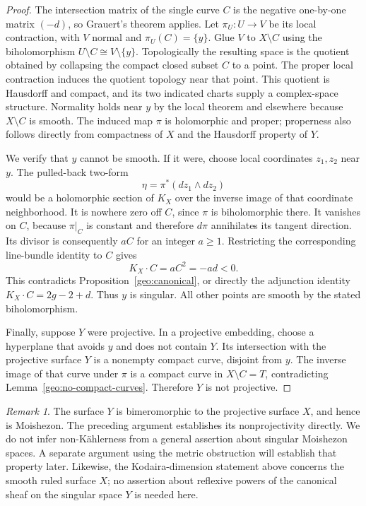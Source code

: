 \documentclass[11pt,a4paper]{article}
\numberwithin{equation}{section}
\theoremstyle{definition}
\theoremstyle{remark}
\newtheorem{remark}[theorem]{Remark}
\begin{document}
\begin{proof}
The intersection matrix of the single curve $C$ is the negative
one-by-one matrix $(-d)$, so Grauert's theorem applies.  Let
$\pi_U:U\to V$ be its local contraction, with $V$ normal and
$\pi_U(C)=\{y\}$.  Glue $V$ to $X\setminus C$ using the
biholomorphism $U\setminus C\cong V\setminus\{y\}$.
Topologically the resulting space is the quotient obtained by
collapsing the compact closed subset $C$ to a point.  The proper
local contraction induces the quotient topology near that point.
This quotient is Hausdorff and compact, and its two indicated
charts supply a complex-space structure.  Normality holds near
$y$ by the local theorem and elsewhere because $X\setminus C$
is smooth.  The induced map $\pi$ is holomorphic and proper;
properness also follows directly from compactness of $X$ and
the Hausdorff property of $Y$.

We verify that $y$ cannot be smooth.  If it were, choose local
coordinates $z_1,z_2$ near $y$.  The pulled-back two-form
\[
  \eta=\pi^*(dz_1\wedge dz_2)
\]
would be a holomorphic section of $K_X$ over the inverse image
of that coordinate neighborhood.  It is nowhere zero off $C$,
since $\pi$ is biholomorphic there.  It vanishes on $C$, because
$\pi|_C$ is constant and therefore $d\pi$ annihilates its tangent
direction.  Its divisor is consequently $aC$ for an integer
$a\geq1$.  Restricting the corresponding line-bundle identity to
$C$ gives
\[
  K_X\cdot C=aC^2=-ad<0.
\]
This contradicts Proposition~\ref{geo:canonical}, or directly
the adjunction identity $K_X\cdot C=2g-2+d$.  Thus $y$ is singular.
All other points are smooth by the stated biholomorphism.

Finally, suppose $Y$ were projective.  In a projective embedding,
choose a hyperplane that avoids $y$ and does not contain $Y$.
Its intersection with the projective surface $Y$ is a nonempty
compact curve, disjoint from $y$.  The inverse image of that
curve under $\pi$ is a compact curve in $X\setminus C=T$,
contradicting Lemma~\ref{geo:no-compact-curves}.  Therefore $Y$
is not projective.
\end{proof}

\begin{remark}\label{geo:scope-singular}
The surface $Y$ is bimeromorphic to the projective surface $X$,
and hence is Moishezon.  The preceding argument establishes its
nonprojectivity directly.  We do not infer non-K\"ahlerness from a
general assertion about singular Moishezon spaces.  A separate
argument using the metric obstruction will establish that property
later.  Likewise, the Kodaira-dimension statement above concerns
the smooth ruled surface $X$; no assertion about reflexive powers
of the canonical sheaf on the singular space $Y$ is needed here.
\end{remark}
\end{document}
